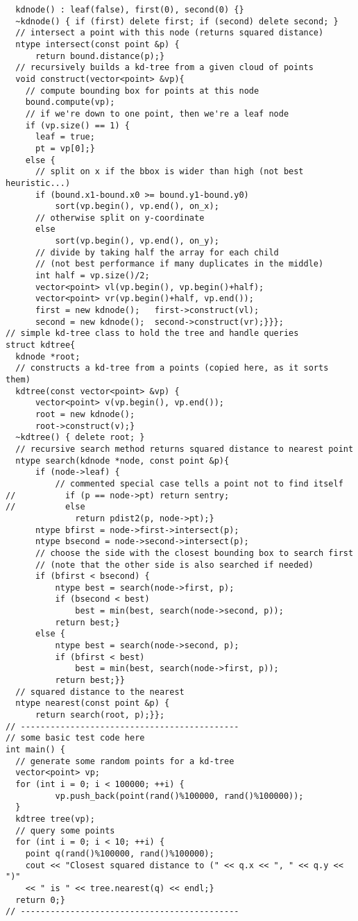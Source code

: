 \documentclass[8pt, oneside]{extarticle}
\begin{document}
\begin{multicols}{3}
\begin{lstlisting}
  kdnode() : leaf(false), first(0), second(0) {}
  ~kdnode() { if (first) delete first; if (second) delete second; }
  // intersect a point with this node (returns squared distance)
  ntype intersect(const point &p) {
      return bound.distance(p);}
  // recursively builds a kd-tree from a given cloud of points
  void construct(vector<point> &vp){
    // compute bounding box for points at this node
    bound.compute(vp);
    // if we're down to one point, then we're a leaf node
    if (vp.size() == 1) {
      leaf = true;
      pt = vp[0];}
    else {
      // split on x if the bbox is wider than high (not best heuristic...)
      if (bound.x1-bound.x0 >= bound.y1-bound.y0)
          sort(vp.begin(), vp.end(), on_x);
      // otherwise split on y-coordinate
      else
          sort(vp.begin(), vp.end(), on_y);
      // divide by taking half the array for each child
      // (not best performance if many duplicates in the middle)
      int half = vp.size()/2;
      vector<point> vl(vp.begin(), vp.begin()+half);
      vector<point> vr(vp.begin()+half, vp.end());
      first = new kdnode();   first->construct(vl);
      second = new kdnode();  second->construct(vr);}}};
// simple kd-tree class to hold the tree and handle queries
struct kdtree{
  kdnode *root;
  // constructs a kd-tree from a points (copied here, as it sorts them)
  kdtree(const vector<point> &vp) {
      vector<point> v(vp.begin(), vp.end());
      root = new kdnode();
      root->construct(v);}
  ~kdtree() { delete root; }
  // recursive search method returns squared distance to nearest point
  ntype search(kdnode *node, const point &p){
      if (node->leaf) {
          // commented special case tells a point not to find itself
//          if (p == node->pt) return sentry;
//          else               
              return pdist2(p, node->pt);}
      ntype bfirst = node->first->intersect(p);
      ntype bsecond = node->second->intersect(p);
      // choose the side with the closest bounding box to search first
      // (note that the other side is also searched if needed)
      if (bfirst < bsecond) {
          ntype best = search(node->first, p);
          if (bsecond < best)
              best = min(best, search(node->second, p));
          return best;}
      else {
          ntype best = search(node->second, p);
          if (bfirst < best)
              best = min(best, search(node->first, p));
          return best;}}
  // squared distance to the nearest 
  ntype nearest(const point &p) {
      return search(root, p);}};
// --------------------------------------------
// some basic test code here
int main() {
  // generate some random points for a kd-tree
  vector<point> vp;
  for (int i = 0; i < 100000; ++i) {
          vp.push_back(point(rand()%100000, rand()%100000));
  }
  kdtree tree(vp);
  // query some points
  for (int i = 0; i < 10; ++i) {
    point q(rand()%100000, rand()%100000);
    cout << "Closest squared distance to (" << q.x << ", " << q.y << ")"
    << " is " << tree.nearest(q) << endl;}    
  return 0;}
// --------------------------------------------
\end{lstlisting}

\end{multicols}
\end{document}
